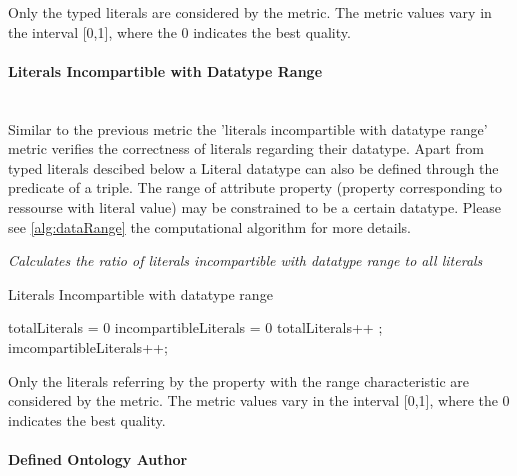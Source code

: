 Only the typed literals are considered by the metric. 
The metric values vary in the interval [0,1], where  the 0 indicates the best quality.



\paragraph{Literals Incompartible with Datatype Range} ~\\ 

Similar to the previous metric the 'literals incompartible with datatype range' metric verifies the correctness of literals regarding their datatype. 
Apart from typed literals descibed below a Literal datatype can also be defined through the predicate of a triple.
The range of attribute property (property corresponding to ressourse with literal value) may be constrained to be a certain datatype.
Please see \ref{alg:dataRange} the computational algorithm for more details.

\begin{mdframed}[style=metricdefinition]
\emph{Calculates the ratio of literals incompartible with datatype range to all literals}
\end{mdframed}


\begin{algorithm}
\caption{Literals Incompartible with datatype range}\label{alg:dataRange}
\begin{algorithmic}[1]
\State totalLiterals = 0
\State incompartibleLiterals = 0
\EndProcedure
{}
 totalLiterals++ ;
 imcompartibleLiterals++; 
\EndIf
\EndIf
{}
\EndProcedure
\end{algorithmic}
\end{algorithm}

Only the literals referring by the property with the range characteristic are considered by the metric. 
The metric values vary in the interval [0,1], where  the 0 indicates the best quality.


\paragraph{Defined Ontology Author} ~\\ 
